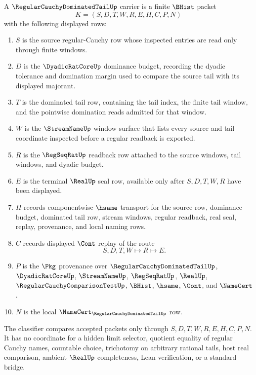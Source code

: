 \begin{definition}
\label{def:regular-cauchy-dominated-tail-carrier}
A $\RegularCauchyDominatedTailUp$ carrier is a finite $\BHist$ packet
$$
K=(S,D,T,W,R,E,H,C,P,N)
$$
with the following displayed rows:
\begin{enumerate}
\item $S$ is the source regular-Cauchy row whose inspected entries are read only through finite windows.
\item $D$ is the $\DyadicRatCoreUp$ dominance budget, recording the dyadic tolerance and domination margin used to compare the source tail with its displayed majorant.
\item $T$ is the dominated tail row, containing the tail index, the finite tail window, and the pointwise domination reads admitted for that window.
\item $W$ is the $\StreamNameUp$ window surface that lists every source and tail coordinate inspected before a regular readback is exported.
\item $R$ is the $\RegSeqRatUp$ readback row attached to the source windows, tail windows, and dyadic budget.
\item $E$ is the terminal $\RealUp$ seal row, available only after $S,D,T,W,R$ have been displayed.
\item $H$ records componentwise $\hsame$ transport for the source row, dominance budget, dominated tail row, stream windows, regular readback, real seal, replay, provenance, and local naming rows.
\item $C$ records displayed $\Cont$ replay of the route
$$
S,D,T,W \longmapsto R \longmapsto E .
$$
\item $P$ is the $\Pkg$ provenance over $\RegularCauchyDominatedTailUp$, $\DyadicRatCoreUp$, $\StreamNameUp$, $\RegSeqRatUp$, $\RealUp$, $\RegularCauchyComparisonTestUp$, $\BHist$, $\hsame$, $\Cont$, and $\NameCert$.
\item $N$ is the local $\NameCert_{\RegularCauchyDominatedTailUp}$ row.
\end{enumerate}
The classifier compares accepted packets only through $S,D,T,W,R,E,H,C,P,N$. It has no coordinate for a hidden limit selector, quotient equality of regular Cauchy names, countable choice, trichotomy on arbitrary rational tails, host real comparison, ambient $\RealUp$ completeness, Lean verification, or a standard bridge.
\end{definition}

